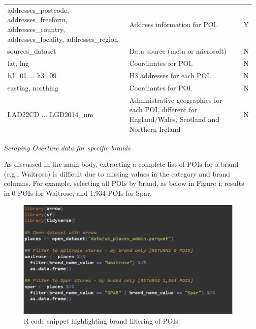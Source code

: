 \documentclass[
]{article}
\begin{document}
\begin{table}[H]
\begin{tabular}{p{6cm}p{6cm}c}
addresses\_postcode, addresses\_freeform, addresses\_country, addresses\_locality, addresses\_region & Address information for POI.                                                                        & Y         \\
sources\_dataset                                                                                     & Data source (meta or microsoft)                                                                     & N         \\
lat, lng                                                                                             & Coordinates for POI.                                                                                & N         \\
h3\_01 ... h3\_09                                                                                    & H3 addresses for each POI.                                                                          & N         \\
easting, northing                                                                                    & Coordiantes for POI.                                                                                & N         \\
LAD22CD ... LGD2014\_nm                                                                              & Administrative geographies for each POI, different for England/Wales, Scotland and Northern Ireland & N         \\
\hline
\end{tabular}
\end{table}

\emph{Scraping Overture data for specific brands}

As discussed in the main body, extracting a complete list of POIs for a
brand (e.g., Waitrose) is difficult due to missing values in the
category and brand columns. For example, selecting all POIs by brand, as
below in Figure i, results in 0 POIs for Waitrose, and 1,934 POIs for
Spar.

\begin{figure}[H]

{\centering \includegraphics{./figures/figure2.png}

}

\caption{R code snippet highlighting brand filtering of POIs.}

\end{figure}%
\end{document}
